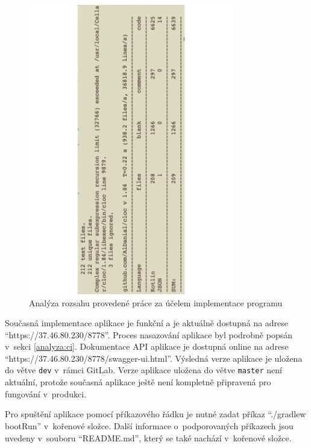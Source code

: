         \begin{figure}\centering
        	   \includegraphics[angle=-90, width=0.8\textwidth]{pdfs/CodeAmountImpl2}
        	   \caption[Analýza kódu implementace]{Analýza rozsahu provedené práce za účelem implementace programu}\label{image:code-count-main}
        \end{figure}
        
        Současná implementace aplikace je funkční a je aktuálně dostupná na adrese \enquote{https://37.46.80.230/8778}. Proces nasazování aplikace byl podrobně popsán v~sekci \ref{analyza:ci}. Dokumentace API aplikace je dostupná online na adrese \enquote{https://37.46.80.230/8778/swagger-ui.html}. Výsledná verze aplikace je uložena do větve \verb|dev| v~rámci GitLab.
        Verze aplikace uložena do větve \verb|master| není aktuální, protože současná aplikace ještě není kompletně připravená pro fungování v~produkci.
        
        Pro spuštění aplikace pomocí příkazového řádku je nutné zadat příkaz \enquote{./gradlew bootRun} v~kořenové složce. Další informace o~podporovaných příkazech jsou uvedeny v~souboru \enquote{README.md}, který se také nachází v~kořenové složce. 
        
